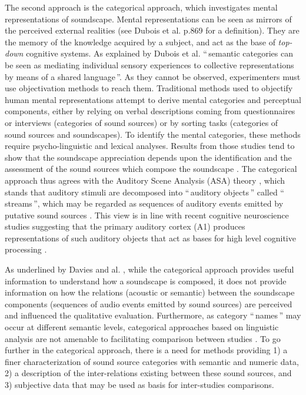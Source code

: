 \documentclass[12pt, titlepage, reqno]{article} %
\begin{document}
The second approach is the categorical approach, which investigates mental representations of soundscape. Mental representations can be seen  as mirrors of the perceived external realities (see Dubois et al. \cite{dubois2006cognitive} p.869 for a definition). They are the memory of the knowledge acquired by a subject, and act as the base of \textit{top-down } cognitive systems. As explained by Dubois et al.  \cite{dubois2006cognitive} ``\,semantic categories can be seen as mediating individual sensory experiences to collective representations by means of a shared language\,''. As they cannot be observed, experimenters must use objectivation methods to reach them. Traditional methods used to objectify human mental representations attempt to derive mental categories and perceptual components, either by relying on verbal descriptions coming from questionnaires or interviews \cite{raimbault_urban_2005, guastavino_ideal_2006, axelsson2005soundscape} (categories of sound sources) or by sorting tasks \cite{guastavino_categorization_2007, maffiolo_caracterisation_1999, houix_lexical_2012} (categories of sound sources and soundscapes).  To identify the mental categories, these methods require psycho-linguistic and lexical analyses. Results from those studies tend to show that the soundscape appreciation depends upon the identification and the assessment of the sound sources which compose the soundscape \cite{raimbault_urban_2005, maffiolo_caracterisation_1999, dubois2006cognitive, guastavino_ideal_2006, guastavino_categorization_2007}. The categorical approach thus agrees with the Auditory Scene Analysis (ASA) theory \cite{bregman1994auditory}, which stands that auditory stimuli are decomposed into ``\,auditory objects\,'' called ``\,streams\,'', which may be regarded as sequences of auditory events emitted by putative sound sources \cite{ciocca2007auditory,winkler2009modeling}. This view is in line with recent cognitive neuroscience studies suggesting that the primary auditory cortex (A1) produces representations of such auditory objects that act as bases for high level cognitive processing \cite{nelken2008neurons}.

As underlined by Davies and al. \cite{davies_perception_2013}, while the categorical approach provides useful information to understand how a soundscape is composed, it does not provide information on how the relations (acoustic or semantic) between the soundscape components (sequences of audio events emitted by sound sources) are perceived and influenced the qualitative evaluation. Furthermore, as category ``\,names\,'' may occur at different semantic levels, categorical approaches based on linguistic analysis are not amenable to facilitating comparison between studies \citep{niessen_categories_2010, brown_towards_2011}. To go further in the categorical approach, there is a need for methods  providing 1) a finer characterization of sound source categories with semantic and numeric data, 2) a description of the inter-relations existing between these sound sources, and 3) subjective data that may be used as basis for inter-studies comparisons.
\end{document}
